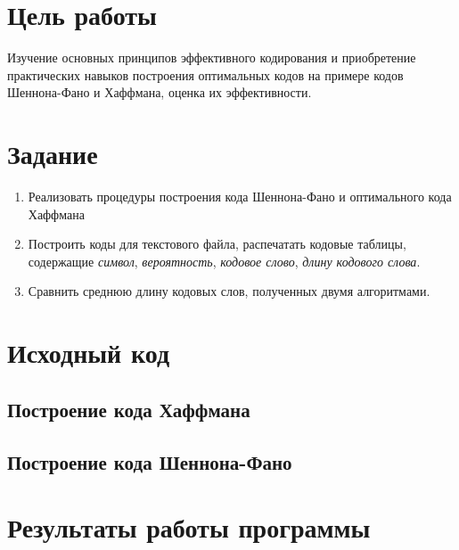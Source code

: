 \documentclass[listings]{labreport}
\begin{document}
\maketitlepage

\section*{Цель работы}

Изучение основных принципов эффективного кодирования и приобретение
практических навыков построения оптимальных кодов на примере
кодов Шеннона-Фано и Хаффмана, оценка их эффективности.

\section*{Задание}

\begin{enumerate}
\item Реализовать процедуры построения кода Шеннона-Фано и оптимального кода Хаффмана 
\item Построить коды для текстового файла, распечатать кодовые таблицы, содержащие
\textit{символ}, \textit{вероятность}, \textit{кодовое слово},
\textit{длину кодового слова}.
\item Сравнить среднюю длину кодовых слов, полученных двумя алгоритмами.
\end{enumerate}

\section*{Исходный код}

\subsection*{Построение кода Хаффмана}


\subsection*{Построение кода Шеннона-Фано}


\section*{Результаты работы программы}

\end{document}

